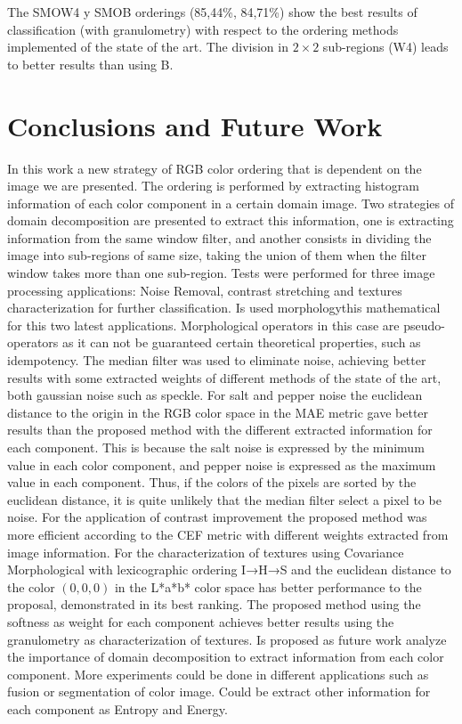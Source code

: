 The SMOW4 y SMOB orderings (85,44\%, 84,71\%) show the best results of classification (with granulometry) with respect to the ordering methods implemented of the state of the art. The division in $2\times2$ sub-regions (W4) leads to better results than using B.  

\section{Conclusions and Future Work}

In this work a new strategy of RGB color ordering that is dependent on the image we are presented. The ordering is performed by extracting histogram information of each color component in a certain domain image. Two strategies of domain decomposition are presented to extract this information, one is extracting information from the same window filter, and another consists in dividing the image into sub-regions of same size, taking the union of them when the filter window takes more than one sub-region.
Tests were performed for three image processing applications: Noise Removal, contrast stretching and textures characterization for further classification. Is used morphologythis mathematical for this two latest applications. Morphological operators in this case are pseudo-operators as it can not be guaranteed certain theoretical properties, such as idempotency. 
The median filter was used to eliminate noise, achieving better results with some extracted weights of different methods of the state of the art, both gaussian noise such as speckle. For salt and pepper noise the euclidean distance to the origin in the RGB color space in the MAE metric gave better results than the proposed method  with the different extracted information for each component. This is because the salt noise is expressed by the minimum value in each color component, and pepper noise is expressed as the maximum value in each component. Thus, if the colors of the pixels are sorted by the euclidean distance, it is quite unlikely that the median filter select a pixel to be noise. 
For the application of contrast improvement the proposed method was more efficient according to the CEF metric with different weights extracted from image information. For the characterization of textures using Covariance Morphological with lexicographic ordering I→H→S \cite{ortiz2004gaussian} and the euclidean distance to the color $(0,0,0)$ in the L*a*b* color space \cite{ortiz2002procesamiento} has better performance to the proposal, demonstrated in its best ranking. The proposed method using the softness as weight for each component achieves better results using the granulometry as characterization of textures.
Is proposed as future work analyze the importance of domain decomposition to extract information from each color component. More experiments could be done in different applications such as fusion or segmentation of color image. Could be extract other information for each component as Entropy and Energy.
 


